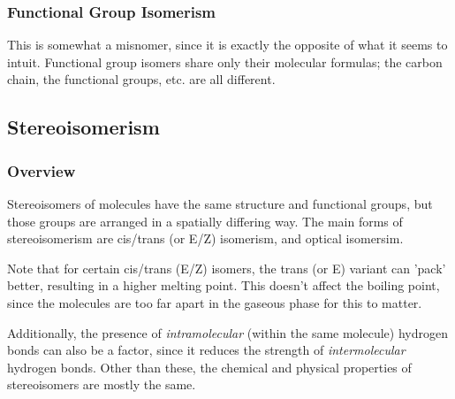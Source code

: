 



	\subsubsection{Functional Group Isomerism}
		This is somewhat a misnomer, since it is exactly the opposite of what it seems to intuit. Functional group isomers
		share only their molecular formulas; the carbon chain, the functional groups, etc. are all different.






\subsection{Stereoisomerism}

	\subsubsection{Overview}
	Stereoisomers of molecules have the same structure and functional groups, but those groups are arranged in a spatially
	differing way. The main forms of stereoisomerism are cis/trans (or E/Z) isomerism, and optical isomersim.

	Note that for certain cis/trans (E/Z) isomers, the trans (or E) variant can 'pack' better, resulting in a higher melting
	point. This doesn't affect the boiling point, since the molecules are too far apart in the gaseous phase for this to matter.

	Additionally, the presence of \textit{intramolecular} (within the same molecule) hydrogen bonds can also be a factor, since
	it reduces the strength of \textit{intermolecular} hydrogen bonds. Other than these, the chemical and physical properties of
	stereoisomers are mostly the same.


	\pagebreak

